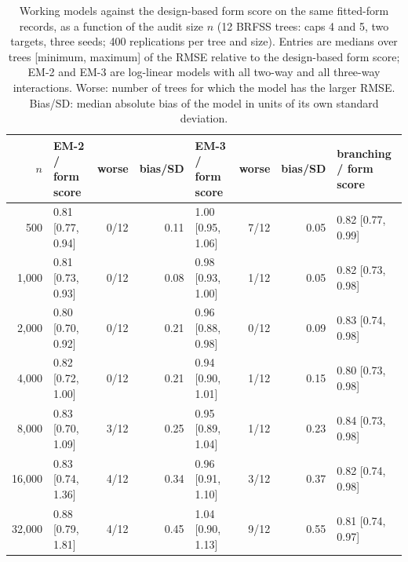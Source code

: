 \begin{table}[h]
\centering
\caption{Working models against the design-based form score on the same fitted-form records, as a function of the audit size $n$ (12 BRFSS trees: caps 4 and 5, two targets, three seeds; 400 replications per tree and size). Entries are medians over trees [minimum, maximum] of the RMSE relative to the design-based form score; EM-2 and EM-3 are log-linear models with all two-way and all three-way interactions. Worse: number of trees for which the model has the larger RMSE. Bias/SD: median absolute bias of the model in units of its own standard deviation.}
\label{tab:curve}
\scriptsize
\setlength{\tabcolsep}{3pt}
\begin{tabular}{rlrrlrrl}
\toprule
$n$ & EM-2 / form score & worse & bias/SD & EM-3 / form score & worse & bias/SD & branching / form score \\
\midrule
500 & 0.81 [0.77, 0.94] & 0/12 & 0.11 & 1.00 [0.95, 1.06] & 7/12 & 0.05 & 0.82 [0.77, 0.99] \\
1,000 & 0.81 [0.73, 0.93] & 0/12 & 0.08 & 0.98 [0.93, 1.00] & 1/12 & 0.05 & 0.82 [0.73, 0.98] \\
2,000 & 0.80 [0.70, 0.92] & 0/12 & 0.21 & 0.96 [0.88, 0.98] & 0/12 & 0.09 & 0.83 [0.74, 0.98] \\
4,000 & 0.82 [0.72, 1.00] & 0/12 & 0.21 & 0.94 [0.90, 1.01] & 1/12 & 0.15 & 0.80 [0.73, 0.98] \\
8,000 & 0.83 [0.70, 1.09] & 3/12 & 0.25 & 0.95 [0.89, 1.04] & 1/12 & 0.23 & 0.84 [0.73, 0.98] \\
16,000 & 0.83 [0.74, 1.36] & 4/12 & 0.34 & 0.96 [0.91, 1.10] & 3/12 & 0.37 & 0.82 [0.74, 0.98] \\
32,000 & 0.88 [0.79, 1.81] & 4/12 & 0.45 & 1.04 [0.90, 1.13] & 9/12 & 0.55 & 0.81 [0.74, 0.97] \\
\bottomrule
\end{tabular}
\end{table}
